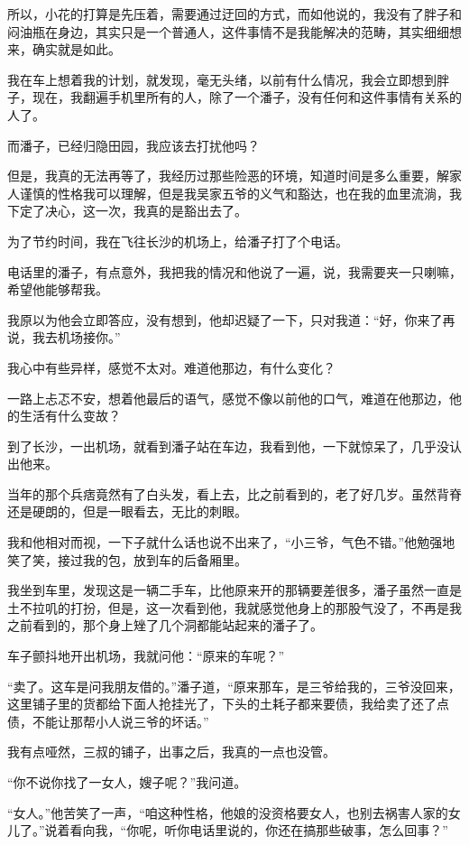 所以，小花的打算是先压着，需要通过迂回的方式，而如他说的，我没有了胖子和闷油瓶在身边，其实只是一个普通人，这件事情不是我能解决的范畴，其实细细想来，确实就是如此。

我在车上想着我的计划，就发现，毫无头绪，以前有什么情况，我会立即想到胖子，现在，我翻遍手机里所有的人，除了一个潘子，没有任何和这件事情有关系的人了。

而潘子，已经归隐田园，我应该去打扰他吗？

但是，我真的无法再等了，我经历过那些险恶的环境，知道时间是多么重要，解家人谨慎的性格我可以理解，但是我吴家五爷的义气和豁达，也在我的血里流淌，我下定了决心，这一次，我真的是豁出去了。

为了节约时间，我在飞往长沙的机场上，给潘子打了个电话。

电话里的潘子，有点意外，我把我的情况和他说了一遍，说，我需要夹一只喇嘛，希望他能够帮我。

我原以为他会立即答应，没有想到，他却迟疑了一下，只对我道：“好，你来了再说，我去机场接你。”

我心中有些异样，感觉不太对。难道他那边，有什么变化？

一路上忐忑不安，想着他最后的语气，感觉不像以前他的口气，难道在他那边，他的生活有什么变故？

到了长沙，一出机场，就看到潘子站在车边，我看到他，一下就惊呆了，几乎没认出他来。

当年的那个兵痞竟然有了白头发，看上去，比之前看到的，老了好几岁。虽然背脊还是硬朗的，但是一眼看去，无比的刺眼。

我和他相对而视，一下子就什么话也说不出来了，“小三爷，气色不错。”他勉强地笑了笑，接过我的包，放到车的后备厢里。

我坐到车里，发现这是一辆二手车，比他原来开的那辆要差很多，潘子虽然一直是土不拉叽的打扮，但是，这一次看到他，我就感觉他身上的那股气没了，不再是我之前看到的，那个身上矬了几个洞都能站起来的潘子了。

车子颤抖地开出机场，我就问他：“原来的车呢？”

“卖了。这车是问我朋友借的。”潘子道，“原来那车，是三爷给我的，三爷没回来，这里铺子里的货都给下面人抢挂光了，下头的土耗子都来要债，我给卖了还了点债，不能让那帮小人说三爷的坏话。”

我有点哑然，三叔的铺子，出事之后，我真的一点也没管。

“你不说你找了一女人，嫂子呢？”我问道。

“女人。”他苦笑了一声，“咱这种性格，他娘的没资格要女人，也别去祸害人家的女儿了。”说着看向我，“你呢，听你电话里说的，你还在搞那些破事，怎么回事？”

